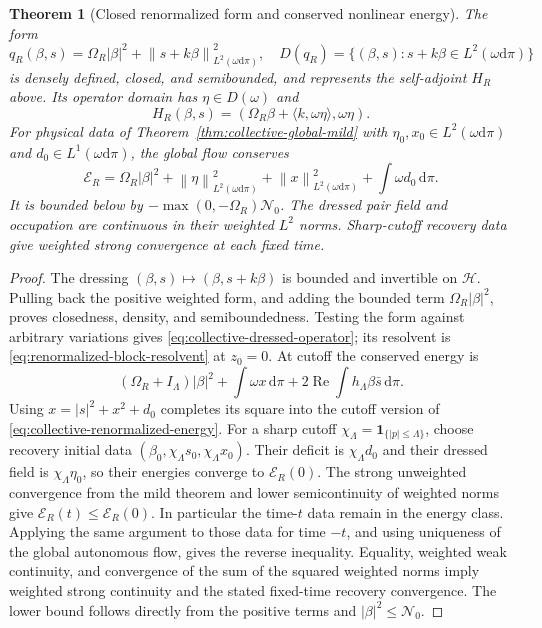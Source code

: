 \documentclass[11pt,a4paper,oneside]{book}
\theoremstyle{plain}
\newtheorem{theorem}{Theorem}[chapter]
\theoremstyle{definition}
\theoremstyle{remark}
\newcommand{\dd}{\mathrm d}
\newcommand{\norm}[1]{\left\lVert#1\right\rVert}
\newcommand{\src}[2]{\cite{#1}}
\begin{document}
\begin{theorem}[Closed renormalized form and conserved nonlinear energy]
\label{thm:collective-energy}
The form
\begin{equation}
 q_R(\beta,s)=\Omega_R|\beta|^2+\norm{s+k\beta}_{L^2(\omega\dd\pi)}^2,
 \quad D(q_R)=\{(\beta,s):s+k\beta\in L^2(\omega\dd\pi)\}
 \label{eq:collective-renormalized-form}
\end{equation}
is densely defined, closed, and semibounded, and represents the
self-adjoint $H_R$ above.  Its operator domain has
$\eta\in D(\omega)$ and
\begin{equation}
 H_R(\beta,s)=(\Omega_R\beta+\langle k,\omega\eta\rangle,
                                            \omega\eta).
 \label{eq:collective-dressed-operator}
\end{equation}
For physical data of Theorem~\ref{thm:collective-global-mild} with
$\eta_0,x_0\in L^2(\omega\dd\pi)$ and $d_0\in L^1(\omega\dd\pi)$,
the global flow conserves
\begin{equation}
 \mathcal E_R=
 \Omega_R|\beta|^2+\norm\eta_{L^2(\omega\dd\pi)}^2
 +\norm x_{L^2(\omega\dd\pi)}^2+\int\omega d_0\,\dd\pi.
 \label{eq:collective-renormalized-energy}
\end{equation}
It is bounded below by $-\max(0,-\Omega_R)\mathcal N_0$.
The dressed pair field and occupation are continuous in their weighted
$L^2$ norms.  Sharp-cutoff recovery data give weighted strong
convergence at each fixed time.
\end{theorem}
\begin{proof}
The dressing $(\beta,s)\mapsto(\beta,s+k\beta)$ is bounded and
invertible on $\mathcal H$.  Pulling back the positive weighted form,
and adding the bounded term $\Omega_R|\beta|^2$, proves closedness,
density, and semiboundedness.  Testing the form against arbitrary
variations gives \eqref{eq:collective-dressed-operator}; its resolvent
is \eqref{eq:renormalized-block-resolvent} at $z_0=0$.
At cutoff the conserved energy is
\[
 (\Omega_R+I_\Lambda)|\beta|^2+
 \int\omega x\,\dd\pi+2\operatorname{Re}\int h_\Lambda\beta\bar s\,\dd\pi.
\]
Using $x=|s|^2+x^2+d_0$ completes its square into the cutoff version
of \eqref{eq:collective-renormalized-energy}.  For a sharp cutoff
$\chi_\Lambda=\mathbf1_{\{|p|\le\Lambda\}}$, choose recovery initial
data $(\beta_0,\chi_\Lambda s_0,\chi_\Lambda x_0)$.  Their deficit is
$\chi_\Lambda d_0$ and their dressed field is
$\chi_\Lambda\eta_0$, so their energies converge to $\mathcal E_R(0)$.
The strong unweighted convergence from the mild theorem and lower
semicontinuity of weighted norms give
$\mathcal E_R(t)\le\mathcal E_R(0)$.  In particular the time-$t$ data
remain in the energy class.  Applying the same argument to those data
for time $-t$, and using uniqueness of the global autonomous flow,
gives the reverse inequality.  Equality, weighted weak continuity,
and convergence of the sum of the squared weighted norms imply
weighted strong continuity and the stated fixed-time recovery
convergence.  The lower bound follows directly from the positive terms
and $|\beta|^2\le\mathcal N_0$.
\end{proof}
\src{R20}{thm:v20v67-form,lem:v20v67-recovery,thm:v20v67-conservation}
\end{document}
